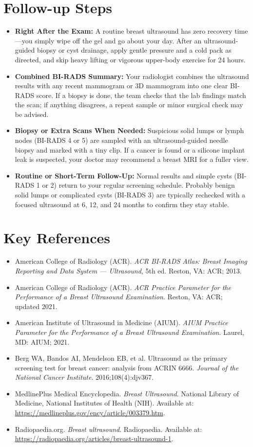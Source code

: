 \section{Follow-up Steps}
\begin{itemize}
\item \textbf{Right After the Exam:} A routine breast ultrasound has zero recovery time---you simply wipe off the gel and go about your day. After an ultrasound-guided biopsy or cyst drainage, apply gentle pressure and a cold pack as directed, and skip heavy lifting or vigorous upper-body exercise for 24 hours.
\item \textbf{Combined BI-RADS Summary:} Your radiologist combines the ultrasound results with any recent mammogram or 3D mammogram into one clear BI-RADS score. If a biopsy is done, the team checks that the lab findings match the scan; if anything disagrees, a repeat sample or minor surgical check may be advised.
\item \textbf{Biopsy or Extra Scans When Needed:} Suspicious solid lumps or lymph nodes (BI-RADS 4 or 5) are sampled with an ultrasound-guided needle biopsy and marked with a tiny clip. If a cancer is found or a silicone implant leak is suspected, your doctor may recommend a breast MRI for a fuller view.
\item \textbf{Routine or Short-Term Follow-Up:} Normal results and simple cysts (BI-RADS 1 or 2) return to your regular screening schedule. Probably benign solid lumps or complicated cysts (BI-RADS 3) are typically rechecked with a focused ultrasound at 6, 12, and 24 months to confirm they stay stable.
\end{itemize}

\section{Key References}
\begin{itemize}
\item American College of Radiology (ACR). \textit{ACR BI-RADS Atlas: Breast Imaging Reporting and Data System --- Ultrasound}, 5th ed. Reston, VA: ACR; 2013.
\item American College of Radiology (ACR). \textit{ACR Practice Parameter for the Performance of a Breast Ultrasound Examination}. Reston, VA: ACR; updated 2021.
\item American Institute of Ultrasound in Medicine (AIUM). \textit{AIUM Practice Parameter for the Performance of a Breast Ultrasound Examination}. Laurel, MD: AIUM; 2021.
\item Berg WA, Bandos AI, Mendelson EB, et al. Ultrasound as the primary screening test for breast cancer: analysis from ACRIN 6666. \textit{Journal of the National Cancer Institute}. 2016;108(4):djv367.
\item MedlinePlus Medical Encyclopedia. \textit{Breast Ultrasound}. National Library of Medicine, National Institutes of Health (NIH). Available at: \url{https://medlineplus.gov/ency/article/003379.htm}.
\item Radiopaedia.org. \textit{Breast ultrasound}. Radiopaedia. Available at: \url{https://radiopaedia.org/articles/breast-ultrasound-1}.
\end{itemize}

